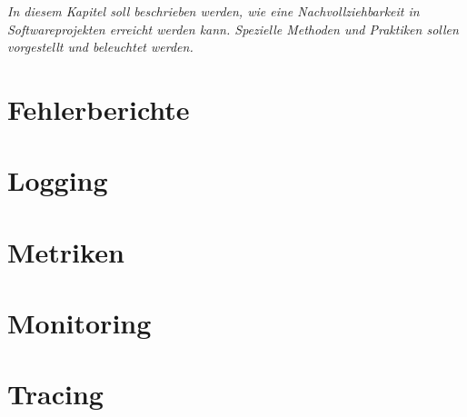 
\textit{In diesem Kapitel soll beschrieben werden, wie eine Nachvollziehbarkeit in Softwareprojekten erreicht werden kann. Spezielle Methoden und Praktiken sollen vorgestellt und beleuchtet werden.}

\section{Fehlerberichte}

\section{Logging}

\section{Metriken}

\section{Monitoring}

\section{Tracing}